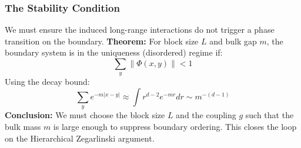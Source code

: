 \subsubsection{The Stability Condition}
We must ensure the induced long-range interactions do not trigger a phase transition on the boundary.
\textbf{Theorem:} For block size $L$ and bulk gap $m$, the boundary system is in the uniqueness (disordered) regime if:
\[
\sum_{y} \|\Phi(x,y)\| < 1
\]
Using the decay bound:
\[
\sum_y e^{-m |x-y|} \approx \int r^{d-2} e^{-mr} dr \sim m^{-(d-1)}
\]
\textbf{Conclusion:} We must choose the block size $L$ and the coupling $g$ such that the bulk mass $m$ is large enough to suppress boundary ordering. This closes the loop on the Hierarchical Zegarlinski argument.



